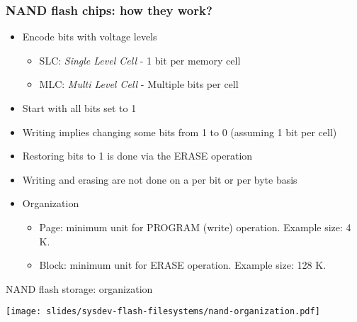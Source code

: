 \begin{frame}
  \frametitle{NAND flash chips: how they work?}
  \begin{itemize}
  \item Encode bits with voltage levels
    \begin{itemize}
      \item SLC: {\em Single Level Cell} - 1 bit per memory cell
      \item MLC: {\em Multi Level Cell} - Multiple bits per cell
    \end{itemize}
  \item Start with all bits set to 1
  \item Writing implies changing some bits from 1 to 0
        (assuming 1 bit per cell)
  \item Restoring bits to 1 is done via the ERASE operation
  \item Writing and erasing are not done on a per bit or per byte
    basis
  \item Organization
    \begin{itemize}
    \item Page: minimum unit for PROGRAM (write) operation. Example size: 4 K.
    \item Block: minimum unit for ERASE operation. Example size: 128 K.
    \end{itemize}
  \end{itemize}
\end{frame}

\begin{frame}{NAND flash storage: organization}
  \begin{center}
    \texttt{[image: slides/sysdev-flash-filesystems/nand-organization.pdf]}
  \end{center}
\end{frame}

